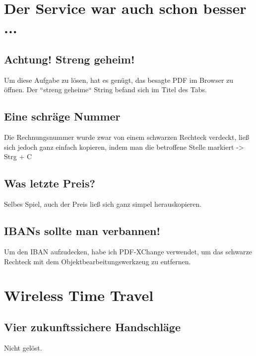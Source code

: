 \documentclass[12pt, a4paper, titlepage, oneside]{scrartcl}
\begin{document}
	\maketitle
	\setcounter{section}{0}
	\setcounter{tocdepth}{2}
	\tableofcontents

	\newpage

	\section{Der Service war auch schon besser ...}

	\subsection{Achtung! Streng geheim!}
	Um diese Aufgabe zu l\"osen, hat es gen\"ugt, das besagte PDF im Browser zu \"offnen.
	Der ``streng geheime`` String befand sich im Titel des Tabs.

	\subsection{Eine schräge Nummer}
	Die Rechnungsnummer wurde zwar von einem schwarzen Rechteck verdeckt, ließ sich
	jedoch ganz einfach kopieren, indem man die betroffene Stelle markiert -> Strg
	+ C

	\subsection{Was letzte Preis?}
	Selbes Spiel, auch der Preis ließ sich ganz simpel herauskopieren.

	\subsection{IBANs sollte man verbannen!}
	Um den IBAN aufzudecken, habe ich PDF-XChange verwendet, um das schwarze Rechteck
	mit dem Objektbearbeitungswerkzeug zu entfernen.

	\section{Wireless Time Travel}

	\subsection{Vier zukunftssichere Handschl\"age}
	Nicht gelöst.
\end{document}
